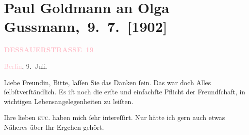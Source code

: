 

\renewcommand{\erwaehntePersonen}{Personen: Peter Dorner, Paul Goldmann, Clementine Goldmann, Hugo von Hofmannsthal, Olga Schnitzler, Heinrich Schnitzler, Elisabeth Steinrück}
\renewcommand{\erwaehnteInstitutionen}{Institutionen: Schiller-Theater}
\renewcommand{\erwaehnteOrte}{Orte: Berlin, Dessauer Straße, Hinterbrühl, Welsberg-Taisten, Wien}
\renewcommand{\erwaehnteWerke}{}
\section[ Paul Goldmann an Olga Gussmann, 9. 7. {[}1902{]}]{Paul Goldmann an Olga Gussmann, 9. 7. {[}1902{]}}
\nopagebreak{}
\rehead{ }\normalsize\beginnumbering{}
\toendnotes[C]{\smallbreak\pagebreak[2]}
\toendnotes[C]{\smallbreak}
\pstart
           \noindent{}\raggedleft{}{\pb}\textcolor{gray}{\textbf{\textcolor{pink}{DESSAUERSTRASSE 19}{}\ledrightnote{\textcolor{pink}{Dessauer Straße}}}}\pend
           
\pstart
           \textcolor{pink}{Berlin}{}\ledrightnote{\textcolor{pink}{Berlin}}, 9. Juli.\pend
           
\pstart\center{}Liebe Freundin,\pend
\pstart
           Bitte, laſſen Sie das Danken ſein. Das war doch Alles ſelbſtverſtändlich. Es iſt noch
               die erſte und einfachſte Pflicht der Freundſchaft, in wichtigen Lebensangelegenheiten
                  \label{K_L03532-1v}\label{K_L03532-1h} zu leiſten.\pend
           
\pstart
           Ihre lieben \label{K_L03532-2v}\label{K_L03532-2h}{ }\textsc{etc.} haben
               mich ſehr intereſſirt. Nur hätte ich gern auch etwas Näheres über Ihr Ergehen
               gehört.\pend
           
